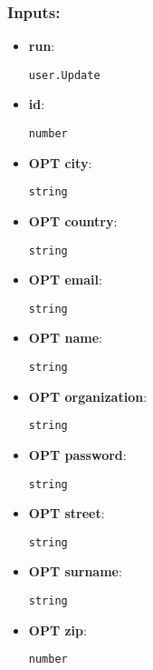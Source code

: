 \subsubsection*{Inputs:}
\begin{itemize}
    \item \textbf{run}: 
\begin{lstlisting}
user.Update
\end{lstlisting}
    \item \textbf{id}: 
\begin{lstlisting}
number
\end{lstlisting}
    \item \textbf{OPT city}: 
\begin{lstlisting}
string
\end{lstlisting}
    \item \textbf{OPT country}: 
\begin{lstlisting}
string
\end{lstlisting}
    \item \textbf{OPT email}: 
\begin{lstlisting}
string
\end{lstlisting}
    \item \textbf{OPT name}: 
\begin{lstlisting}
string
\end{lstlisting}
    \item \textbf{OPT organization}: 
\begin{lstlisting}
string
\end{lstlisting}
    \item \textbf{OPT password}: 
\begin{lstlisting}
string
\end{lstlisting}
    \item \textbf{OPT street}: 
\begin{lstlisting}
string
\end{lstlisting}
    \item \textbf{OPT surname}: 
\begin{lstlisting}
string
\end{lstlisting}
    \item \textbf{OPT zip}: 
\begin{lstlisting}
number
\end{lstlisting}
  \end{itemize}

